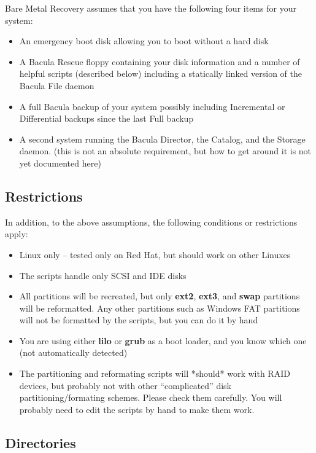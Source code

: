 Bare Metal Recovery assumes that you have the following four items for your
system: 

\begin{itemize}
\item An emergency boot disk allowing you to boot without a  hard disk  
\item A Bacula Rescue floppy containing your disk information and  a number of
   helpful scripts (described below) including a  statically linked version of
   the Bacula File daemon 
\item A full Bacula backup of your system possibly including  Incremental or
   Differential backups since the last Full  backup 
\item A second system running the Bacula Director, the Catalog,  and the
   Storage daemon. (this is not an absolute requirement,  but how to get around
   it is not yet documented here) 
\end{itemize}

\subsection*{Restrictions}

In addition, to the above assumptions, the following conditions or
restrictions apply: 

\begin{itemize}
\item Linux only -- tested only on Red Hat, but should work on other Linuxes  
\item The scripts handle only SCSI and IDE disks  
\item All partitions will be recreated, but only {\bf ext2},  {\bf ext3}, and
   {\bf swap} partitions will be reformatted.  Any other partitions such as
   Windows FAT partitions will  not be formatted by the scripts, but you can do
it by hand  
\item You are using either {\bf lilo} or {\bf grub} as a boot  loader, and you
   know which one (not automatically detected)  
\item The partitioning and reformating scripts will *should* work with RAID 
   devices, but probably not with other ``complicated'' disk 
   partitioning/formating schemes. Please check them carefully. You  will
probably need to edit the scripts by hand to make them work. 
\end{itemize}

\subsection*{Directories}

